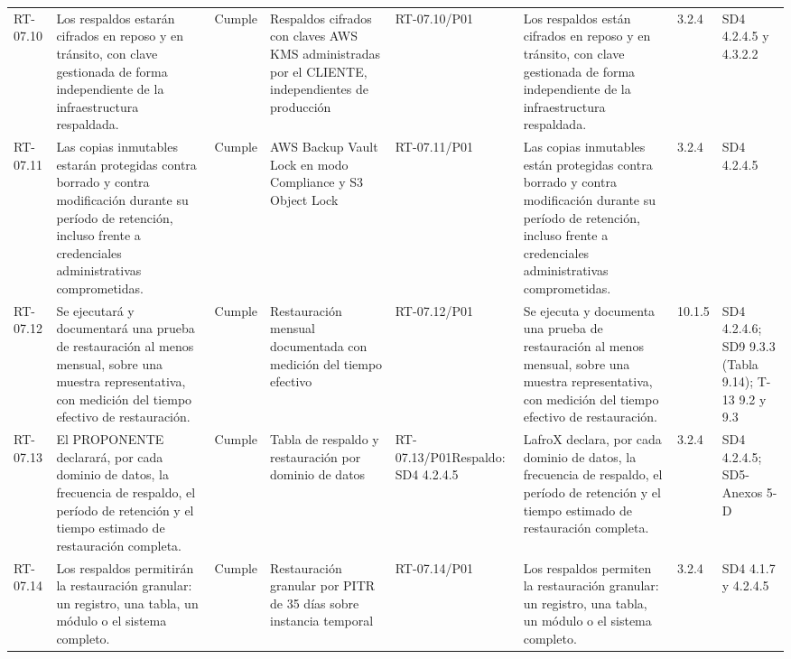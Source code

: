 \documentclass[oficio,firma,final]{lafrox}
\begin{document}
\begin{landscape}
{\begin{longtable}{@{}F{0.054} F{0.173} F{0.061} F{0.191} F{0.106} F{0.180} F{0.067} F{0.168}@{}}
  RT-07.10 & Los respaldos estarán cifrados en reposo y en tránsito, con clave gestionada de forma independiente de la infraestructura respaldada. & Cumple & Respaldos cifrados con claves AWS KMS administradas por el CLIENTE, independientes de producción & RT-07.10/\allowbreak{}P01 & Los respaldos están cifrados en reposo y en tránsito, con clave gestionada de forma independiente de la infraestructura respaldada. & 3.2.4 & SD4 4.2.4.5 y 4.3.2.2  \\
  RT-07.11 & Las copias inmutables estarán protegidas contra borrado y contra modificación durante su período de retención, incluso frente a credenciales administrativas comprometidas. & Cumple & AWS Backup Vault Lock en modo Compliance y S3 Object Lock & RT-07.11/\allowbreak{}P01 & Las copias inmutables están protegidas contra borrado y contra modificación durante su período de retención, incluso frente a credenciales administrativas comprometidas. & 3.2.4 & SD4 4.2.4.5  \\
  RT-07.12 & Se ejecutará y documentará una prueba de restauración al menos mensual, sobre una muestra representativa, con medición del tiempo efectivo de restauración. & Cumple & Restauración mensual documentada con medición del tiempo efectivo & RT-07.12/\allowbreak{}P01 & Se ejecuta y documenta una prueba de restauración al menos mensual, sobre una muestra representativa, con medición del tiempo efectivo de restauración. & 10.1.5 & SD4 4.2.4.6; SD9 9.3.3 (Tabla 9.14); T-13 9.2 y 9.3  \\
  RT-07.13 & El PROPONENTE declarará, por cada dominio de datos, la frecuencia de respaldo, el período de retención y el tiempo estimado de restauración completa. & Cumple & Tabla de respaldo y restauración por dominio de datos & RT-07.13/\allowbreak{}P01\newline Respaldo: SD4 4.2.4.5 & LafroX declara, por cada dominio de datos, la frecuencia de respaldo, el período de retención y el tiempo estimado de restauración completa. & 3.2.4 & SD4 4.2.4.5; SD5-Anexos 5-D  \\
  RT-07.14 & Los respaldos permitirán la restauración granular: un registro, una tabla, un módulo o el sistema completo. & Cumple & Restauración granular por PITR de 35 días sobre instancia temporal & RT-07.14/\allowbreak{}P01 & Los respaldos permiten la restauración granular: un registro, una tabla, un módulo o el sistema completo. & 3.2.4 & SD4 4.1.7 y 4.2.4.5  \\

\end{longtable}}
\end{landscape}
\end{document}
